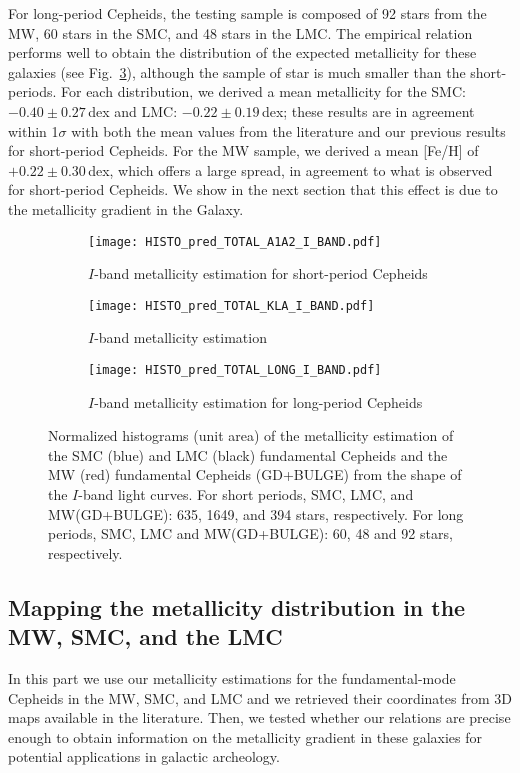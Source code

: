 \documentclass[article]{aa} %
\begin{document}
For long-period Cepheids, the testing sample is composed of 92 stars from the MW, 60 stars in the SMC, and 48 stars in the LMC. The empirical relation performs well to obtain the distribution of the expected metallicity for these galaxies (see Fig.~\ref{fig:histo_long_Iband}), although the sample of star is much smaller than the short-periods. For each distribution, we derived a mean metallicity for the SMC: $-0.40\pm0.27\,$dex and LMC: $-0.22\pm0.19\,$dex; these results are in agreement within 1$\sigma$ with both the mean values from the literature and our previous results for short-period Cepheids. For the MW sample, we derived a mean [Fe/H] of $+0.22\pm0.30\,$dex, which offers a large spread, in agreement to what is observed for short-period Cepheids.
 We show in the next section that this effect is due to the metallicity gradient in the Galaxy.

\begin{figure}
\begin{subfigure}{0.50\textwidth}
\texttt{[image: HISTO\_pred\_TOTAL\_A1A2\_I\_BAND.pdf]}
\caption{$I$-band metallicity estimation for short-period Cepheids} \label{fig:histo_short_Iband}
\end{subfigure}%


\begin{subfigure}{0.50\textwidth}
\texttt{[image: HISTO\_pred\_TOTAL\_KLA\_I\_BAND.pdf]}
\caption{$I$-band metallicity estimation \citep{Klagyivik2013}} \label{fig:histo_KLA}
\end{subfigure}

\begin{subfigure}{0.50\textwidth}
\texttt{[image: HISTO\_pred\_TOTAL\_LONG\_I\_BAND.pdf]}
\caption{$I$-band metallicity estimation for long-period Cepheids} \label{fig:histo_long_Iband}
\end{subfigure}
\caption{Normalized histograms (unit area)  of the metallicity estimation of the SMC (blue) and LMC (black) fundamental Cepheids and the MW (red) fundamental Cepheids (GD+BULGE)   from the shape of the $I$-band light curves. For short periods, SMC, LMC, and MW(GD+BULGE): 635, 1649, and 394 stars, respectively. For long periods, SMC, LMC and MW(GD+BULGE): 60, 48 and 92 stars, respectively.\label{fig:result_I_band}}
\end{figure}


\subsection{Mapping the metallicity distribution in the MW, SMC, and the LMC}
In this part we use our metallicity estimations for the fundamental-mode Cepheids in the MW, SMC, and LMC and we retrieved their coordinates from 3D maps available in the literature. Then, we tested whether our relations are precise enough to obtain information on the metallicity gradient in these galaxies for potential applications in galactic archeology. 
\end{document}
